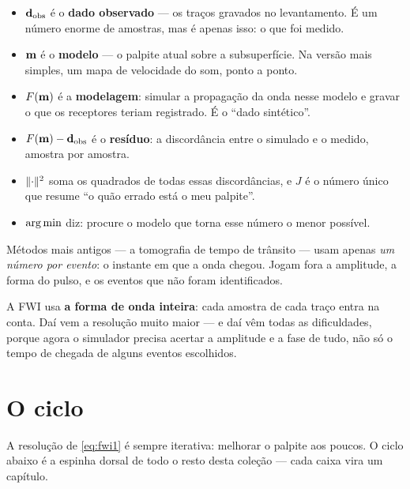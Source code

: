 \documentclass[11pt,a4paper,oneside]{report}
\begin{document}
\begin{itemize}[leftmargin=*]
\item $\mathbf{d}_{\mathrm{obs}}$ \'e o \textbf{dado observado} --- os tra\c{c}os gravados no
levantamento. \'E um n\'umero enorme de amostras, mas \'e apenas isso: o que
foi medido.
\item $\mathbf{m}$ \'e o \textbf{modelo} --- o palpite atual sobre a
subsuperf\'icie. Na vers\~ao mais simples, um mapa de velocidade do som,
ponto a ponto.
\item $F(\mathbf{m})$ \'e a \textbf{modelagem}: simular a propaga\c{c}\~ao da onda
nesse modelo e gravar o que os receptores teriam registrado. \'E o
``dado sint\'etico''.
\item $F(\mathbf{m}) - \mathbf{d}_{\mathrm{obs}}$ \'e o \textbf{res\'iduo}: a discord\^ancia entre o
simulado e o medido, amostra por amostra.
\item $\lVert \cdot \rVert^{2}$ soma os quadrados de todas essas discord\^ancias, e
$J$ \'e o n\'umero \'unico que resume ``o qu\~ao errado est\'a o meu
palpite''.
\item $\operatorname*{arg\,min}$ diz: procure o modelo que torna esse n\'umero o menor
poss\'ivel.
\end{itemize}

\begin{teoria}
M\'etodos mais antigos --- a tomografia de tempo de tr\^ansito --- usam
apenas \emph{um n\'umero por evento}: o instante em que a onda chegou. Jogam
fora a amplitude, a forma do pulso, e os eventos que n\~ao foram
identificados.

A FWI usa \textbf{a forma de onda inteira}: cada amostra de cada tra\c{c}o
entra na conta. Da\'i vem a resolu\c{c}\~ao muito maior --- e da\'i v\^em
todas as dificuldades, porque agora o simulador precisa acertar a amplitude e
a fase de tudo, n\~ao s\'o o tempo de chegada de alguns eventos escolhidos.
\end{teoria}

\section{O ciclo}

A resolu\c{c}\~ao de \eqref{eq:fwi1} \'e sempre iterativa: melhorar o palpite
aos poucos. O ciclo abaixo \'e a espinha dorsal de todo o resto desta
cole\c{c}\~ao --- cada caixa vira um cap\'itulo.
\end{document}
